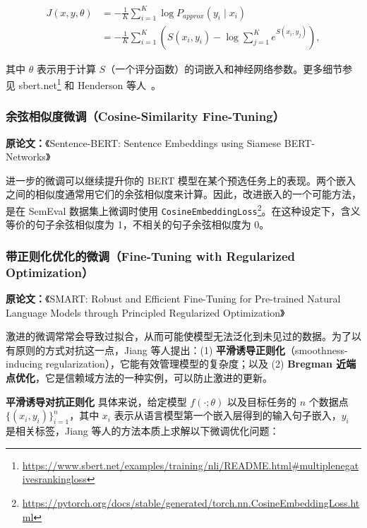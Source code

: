 \documentclass[11pt]{article}
\begin{document}
\begin{equation*}
\begin{aligned}
J(x, y, \theta) &= -\frac{1}{K}\sum_{i=1}^{K} \log P_{approx}(y_i \mid x_i) \\
                &= -\frac{1}{K}\sum_{i=1}^{K}\left( S(x_i, y_i) - \log\sum_{j=1}^{K} e^{S(x_i, y_j)} \right),
\end{aligned}
\end{equation*}

其中 $\theta$ 表示用于计算 $S$（一个评分函数）的词嵌入和神经网络参数。更多细节参见 sbert.net\footnote{\url{https://www.sbert.net/examples/training/nli/README.html\#multiplenegativesrankingloss}} 和 Henderson 等人~\cite{henderson2017efficient}。

\subsubsection{余弦相似度微调（Cosine-Similarity Fine-Tuning）}

\textbf{原论文：}《Sentence-BERT: Sentence Embeddings using Siamese BERT-Networks》~\cite{reimers2019sentence}

进一步的微调可以继续提升你的 BERT 模型在某个预选任务上的表现。两个嵌入之间的相似度通常用它们的余弦相似度来计算。因此，改进嵌入的一个可能方法，是在 SemEval 数据集上微调时使用 \texttt{CosineEmbeddingLoss}\footnote{\url{https://pytorch.org/docs/stable/generated/torch.nn.CosineEmbeddingLoss.html}}。在这种设定下，含义等价的句子余弦相似度为 1，不相关的句子余弦相似度为 0。

\subsubsection{带正则化优化的微调（Fine-Tuning with Regularized Optimization）}

\textbf{原论文：}《SMART: Robust and Efficient Fine-Tuning for Pre-trained Natural Language Models through Principled Regularized Optimization》~\cite{jiang2019smart}

激进的微调常常会导致过拟合，从而可能使模型无法泛化到未见过的数据。为了以有原则的方式对抗这一点，Jiang 等人提出：(1) \textbf{平滑诱导正则化}（smoothness-inducing regularization），它能有效管理模型的复杂度；以及 (2) \textbf{Bregman 近端点优化}，它是信赖域方法的一种实例，可以防止激进的更新。

\textbf{平滑诱导对抗正则化} 具体来说，给定模型 $f(\cdot; \theta)$ 以及目标任务的 $n$ 个数据点 $\{(x_i, y_i)\}_{i=1}^{n}$，其中 $x_i$ 表示从语言模型第一个嵌入层得到的输入句子嵌入，$y_i$ 是相关标签，Jiang 等人的方法本质上求解以下微调优化问题：
\end{document}
